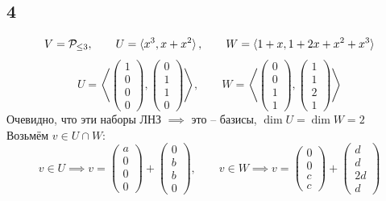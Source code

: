 \subsection{4}

$$ V = \mathcal{P}_{\le 3}, \qquad U = \braket{x^3, x + x^2}, \qquad W = \braket{1 + x, 1 + 2x + x^2 + x^3} $$
$$ U = \left\langle
\begin{pmatrix}
	1 \\
    0 \\
    0 \\
    0
\end{pmatrix},
\begin{pmatrix}
	0 \\
    1 \\
    1 \\
    0
\end{pmatrix} \right\rangle, \qquad W = \left\langle
\begin{pmatrix}
	0 \\
    0 \\
    1 \\
    1
\end{pmatrix},
\begin{pmatrix}
	1 \\
    1 \\
    2 \\
    1
\end{pmatrix} \right\rangle $$
Очевидно, что эти наборы ЛНЗ $ \implies $ это -- базисы, $ \dim U = \dim W = 2 $ \\
Возьмём $ v \in U \cap W $:
$$ v \in U \implies v =
\begin{pmatrix}
	a \\
    0 \\
    0 \\
    0
\end{pmatrix} +
\begin{pmatrix}
	0 \\
    b \\
    b \\
    0
\end{pmatrix}, \qquad v \in W \implies v =
\begin{pmatrix}
	0 \\
    0 \\
    c \\
    c
\end{pmatrix} +
\begin{pmatrix}
	d \\
    d \\
    2d \\
    d
\end{pmatrix} $$
